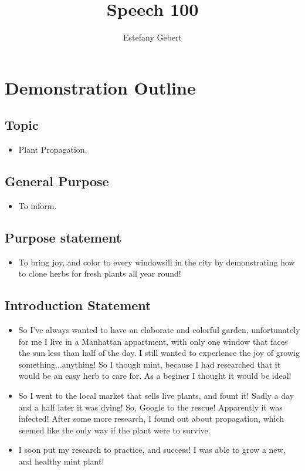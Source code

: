 \documentclass[]{article}
\title{Speech 100}
\author{Estefany Gebert}
\begin{document}
\maketitle 


\section{Demonstration Outline}
\subsection{Topic}
\begin{itemize}
	\item Plant Propagation.
\end{itemize}
\subsection{General Purpose}
\begin{itemize}
	\item To inform.
\end{itemize}
\subsection{Purpose statement} 
\begin{itemize}
	\item To bring joy, and color to every windowsill in the city by demonstrating how to clone herbs for fresh plants all year round!
\end{itemize}
\subsection{Introduction Statement}
\begin{itemize}
	
	\item So I've always wanted to have an elaborate and colorful garden, unfortunately for me I live in a Manhattan appartment, with only one window that faces the sun less than half of the day. I still wanted to experience the joy of growig something...anything! So I though mint, because I had researched that it would be an easy herb to care for. As a beginer I thought it would be ideal!
	\item So I went to the local market that sells live plants, and fount it! Sadly a day and a half later it was dying! So, Google to the rescue! Apparently it was infected! After some more research, I found out about propagation, which seemed like the only way if the plant were to survive. 
	\item I soon put my research to practice, and success! I was able to grow a new, and healthy mint plant!
\end{itemize}
\end{document}

